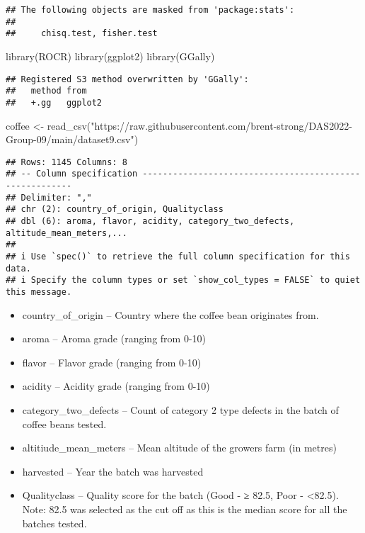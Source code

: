 \documentclass[
]{article}
\newenvironment{Shaded}{\begin{snugshade}}{\end{snugshade}}
\newcommand{\FunctionTok}[1]{\textcolor[rgb]{0.00,0.00,0.00}{#1}}
\newcommand{\NormalTok}[1]{#1}
\newcommand{\OtherTok}[1]{\textcolor[rgb]{0.56,0.35,0.01}{#1}}
\newcommand{\StringTok}[1]{\textcolor[rgb]{0.31,0.60,0.02}{#1}}
\providecommand{\tightlist}{%
  \setlength{\itemsep}{0pt}\setlength{\parskip}{0pt}}
\begin{document}
\begin{verbatim}
## The following objects are masked from 'package:stats':
## 
##     chisq.test, fisher.test
\end{verbatim}

\begin{Shaded}
\begin{Highlighting}[]
\FunctionTok{library}\NormalTok{(ROCR)}
\FunctionTok{library}\NormalTok{(ggplot2)}
\FunctionTok{library}\NormalTok{(GGally)}
\end{Highlighting}
\end{Shaded}

\begin{verbatim}
## Registered S3 method overwritten by 'GGally':
##   method from   
##   +.gg   ggplot2
\end{verbatim}

\begin{Shaded}
\begin{Highlighting}[]
\NormalTok{coffee }\OtherTok{\textless{}{-}} \FunctionTok{read\_csv}\NormalTok{(}\StringTok{"https://raw.githubusercontent.com/brent{-}strong/DAS2022{-}Group{-}09/main/dataset9.csv"}\NormalTok{)}
\end{Highlighting}
\end{Shaded}

\begin{verbatim}
## Rows: 1145 Columns: 8
## -- Column specification --------------------------------------------------------
## Delimiter: ","
## chr (2): country_of_origin, Qualityclass
## dbl (6): aroma, flavor, acidity, category_two_defects, altitude_mean_meters,...
## 
## i Use `spec()` to retrieve the full column specification for this data.
## i Specify the column types or set `show_col_types = FALSE` to quiet this message.
\end{verbatim}

\begin{itemize}
\tightlist
\item
  country\_of\_origin -- Country where the coffee bean originates from.
\item
  aroma -- Aroma grade (ranging from 0-10)
\item
  flavor -- Flavor grade (ranging from 0-10)
\item
  acidity -- Acidity grade (ranging from 0-10)
\item
  category\_two\_defects -- Count of category 2 type defects in the
  batch of coffee beans tested.
\item
  altitiude\_mean\_meters -- Mean altitude of the growers farm (in
  metres)
\item
  harvested -- Year the batch was harvested
\item
  Qualityclass -- Quality score for the batch (Good - ≥ 82.5, Poor -
  \textless82.5). Note: 82.5 was selected as the cut off as this is the
  median score for all the batches tested.
\end{itemize}
\end{document}
